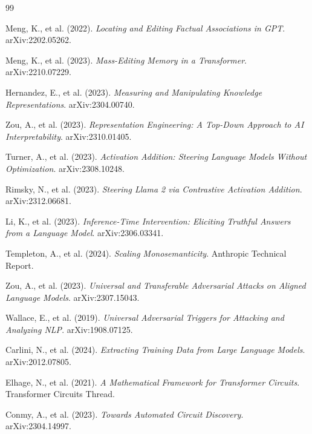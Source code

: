 \documentclass[10pt, twocolumn]{article}
\begin{document}
\clearpage
\begin{thebibliography}{99}

Meng, K., et al. (2022). \textit{Locating and Editing Factual Associations in GPT}. arXiv:2202.05262.
    
Meng, K., et al. (2023). \textit{Mass-Editing Memory in a Transformer}. arXiv:2210.07229.
    
Hernandez, E., et al. (2023). \textit{Measuring and Manipulating Knowledge Representations}. arXiv:2304.00740.
    
Zou, A., et al. (2023). \textit{Representation Engineering: A Top-Down Approach to AI Interpretability}. arXiv:2310.01405.
    
Turner, A., et al. (2023). \textit{Activation Addition: Steering Language Models Without Optimization}. arXiv:2308.10248.
    
Rimsky, N., et al. (2023). \textit{Steering Llama 2 via Contrastive Activation Addition}. arXiv:2312.06681.
    
Li, K., et al. (2023). \textit{Inference-Time Intervention: Eliciting Truthful Answers from a Language Model}. arXiv:2306.03341.

Templeton, A., et al. (2024). \textit{Scaling Monosemanticity}. Anthropic Technical Report.

Zou, A., et al. (2023). \textit{Universal and Transferable Adversarial Attacks on Aligned Language Models}. arXiv:2307.15043.

Wallace, E., et al. (2019). \textit{Universal Adversarial Triggers for Attacking and Analyzing NLP}. arXiv:1908.07125.

Carlini, N., et al. (2024). \textit{Extracting Training Data from Large Language Models}. arXiv:2012.07805.

Elhage, N., et al. (2021). \textit{A Mathematical Framework for Transformer Circuits}. Transformer Circuits Thread.

Conmy, A., et al. (2023). \textit{Towards Automated Circuit Discovery}. arXiv:2304.14997.


\end{thebibliography}
\end{document}
